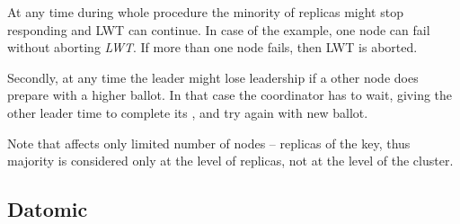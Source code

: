 At any time during whole procedure the minority of replicas might stop responding and LWT can continue. In case of the example, one node can fail without aborting \emph{LWT}. If more than one node fails, then LWT is aborted. 

Secondly, at any time the leader might lose leadership if a other node does prepare with a higher ballot. In that case the coordinator has to wait, giving the other leader time to complete its \lwt, and try again with new ballot.

Note that \lwt affects only limited number of nodes -- replicas of the key, thus majority is considered only at the level of replicas, not at the level of the cluster.






\subsection{Datomic}
